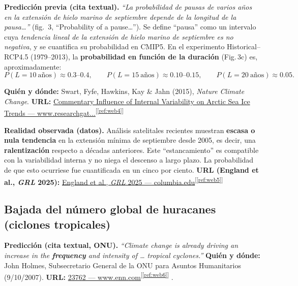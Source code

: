 \documentclass[
  10pt,
  a4paper,
  DIV=11,
  numbers=noendperiod,
  open=any]{scrreprt}
\numberwithin{equation}{chapter}
\numberwithin{equation}{section}
\renewcommand{\[}{\begin{equation}}
\renewcommand{\]}{\end{equation}}
\newcommand{\refweb}[3]{%
  \href{#1}{#2}\textsuperscript{[\ref{ref:#3}]}%
}
\begin{document}
\textbf{Predicción previa (cita textual).}
\emph{“La probabilidad de pausas de varios años en la extensión de hielo marino de septiembre depende de la longitud de la pausa\ldots{}”} (fig.~3, “Probability of a pause\ldots{}”). Se define “pausa” como un intervalo cuya \emph{tendencia lineal de la extensión de hielo marino de septiembre es no negativa}, y se cuantifica su probabilidad en CMIP5. En el experimento Historical--RCP4.5 (1979--2013), la \textbf{probabilidad en función de la duración} (Fig.\,3c) es, aproximadamente:
\[
P(L{=}10~\text{años}) \approx 0.3\text{--}0.4,\qquad
P(L{=}15~\text{años}) \approx 0.10\text{--}0.15,\qquad
P(L{=}20~\text{años}) \approx 0.05.
\]


\textbf{Quién y dónde:} Swart, Fyfe, Hawkins, Kay \& Jahn (2015), \textit{Nature Climate Change}.
\textbf{URL:} \refweb{https://www.researchgate.net/profile/Jennifer-Kay-7/publication/276333917_COMMENTARY_Influence_of_internal_variability_on_Arctic_sea-ice_trends/links/5d6738cc299bf11adf298934/COMMENTARY-Influence-of-internal-variability-on-Arctic-sea-ice-trends.pdf}{Commentary Influence of Internal Variability on Arctic Sea Ice Trends — www.researchgat...}{web4}

\textbf{Realidad observada (datos).}
Análisis satelitales recientes muestran \textbf{escasa o nula tendencia} en la extensión mínima de septiembre desde 2005, es decir, una \textbf{ralentización} respecto a décadas anteriores. Este “estancamiento” es compatible con la variabilidad interna y no niega el descenso a largo plazo. La probabilidad de que esto ocurriese fue cuantificada en un cinco por ciento. 
\textbf{URL (England et al., \textit{GRL} 2025):}
\refweb{https://www.columbia.edu/\string~lmp/paps/england\%2Betal-GRL-2025.pdf}
{England et al., \textit{GRL} 2025 — columbia.edu}
{web5}
\medskip

\subsection{Bajada del número global de huracanes (ciclones tropicales)}

\textbf{Predicción (cita textual, ONU).}
\emph{“Climate change is already driving an increase in the \textbf{frequency} and intensity of \dots{} tropical cyclones.”}
\textbf{Quién y dónde:} John Holmes, Subsecretario General de la ONU para Asuntos Humanitarios (9/10/2007).
\textbf{URL:} \refweb{https://www.enn.com/articles/23762}{23762 — www.enn.com}{web6}.
\end{document}
